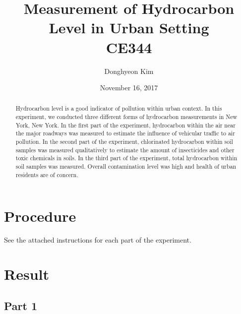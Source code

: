 \documentclass{article}
\begin{document}
\begin{titlepage}
\title{\bfseries Measurement of Hydrocarbon Level in Urban Setting \\
	\large CE344}
\author{Donghyeon Kim}
\date{November 16, 2017}
\maketitle
\thispagestyle{empty}
\end{titlepage}

\begin{abstract}
Hydrocarbon level is a good indicator of pollution within urban context. In this experiment, we conducted three different forms of hydrocarbon measurements in New York, New York. In the first part of the experiment, hydrocarbon within the air near the major roadways was measured to estimate the influence of vehicular traffic to air pollution. In the second part of the experiment, chlorinated hydrocarbon within soil samples was measured qualitatively to estimate the amount of insecticides and other toxic chemicals in soils. In the third part of the experiment, total hydrocarbon within soil samples was measured. Overall contamination level was high and health of urban residents are of concern.
\end{abstract}

\tableofcontents
\listoffigures
\listoftables
\thispagestyle{empty}
\newpage

\setcounter{page}{1}
\section{Procedure}\label{sec:procedure}

See the attached instructions for each part of the experiment.

\section{Result}\label{sec:result}
\subsection{Part 1}
\end{document}
